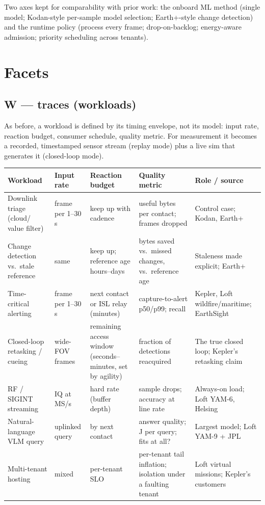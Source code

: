 \documentclass[11pt]{article}
\begin{document}
Two axes kept for comparability with prior work: the onboard ML method (single model; Kodan-style
per-sample model selection; Earth+-style change detection) and the runtime policy (process every frame;
drop-on-backlog; energy-aware admission; priority scheduling across tenants).

\section{Facets}

\subsection{W --- traces (workloads)}

As before, a workload is defined by its timing envelope, not its model: input rate, reaction budget,
consumer schedule, quality metric. For measurement it becomes a recorded, timestamped sensor stream
(replay mode) plus a live sim that generates it (closed-loop mode).

\begin{center}
\small
\begin{tabularx}{\textwidth}{@{}P{2.5cm}P{2.1cm}P{2.5cm}P{2.6cm}L@{}}
\toprule
\textbf{Workload} & \textbf{Input rate} & \textbf{Reaction budget} & \textbf{Quality metric} & \textbf{Role / source} \\
\midrule
Downlink triage (cloud/ value filter) & frame per 1--30\,s & keep up with cadence & useful bytes per contact; frames dropped & Control case; Kodan, Earth+ \\
\addlinespace
Change detection vs.\ stale reference & same & keep up; reference age hours--days & bytes saved vs.\ missed changes, vs.\ reference age & Staleness made explicit; Earth+ \\
\addlinespace
Time-critical alerting & frame per 1--30\,s & next contact or ISL relay (minutes) & capture-to-alert p50/p99; recall & Kepler, Loft wildfire/maritime; EarthSight \\
\addlinespace
Closed-loop retasking / cueing & wide-FOV frames & remaining access window (seconds--minutes, set by agility) & fraction of detections reacquired & The true closed loop; Kepler's retasking claim \\
\addlinespace
RF / SIGINT streaming & IQ at MS/s & hard rate (buffer depth) & sample drops; accuracy at line rate & Always-on load; Loft YAM-6, Helsing \\
\addlinespace
Natural-language VLM query & uplinked query & by next contact & answer quality; J per query; fits at all? & Largest model; Loft YAM-9 + JPL \\
\addlinespace
Multi-tenant hosting & mixed & per-tenant SLO & per-tenant tail inflation; isolation under a faulting tenant & Loft virtual missions; Kepler's customers \\
\bottomrule
\end{tabularx}
\end{center}
\end{document}
